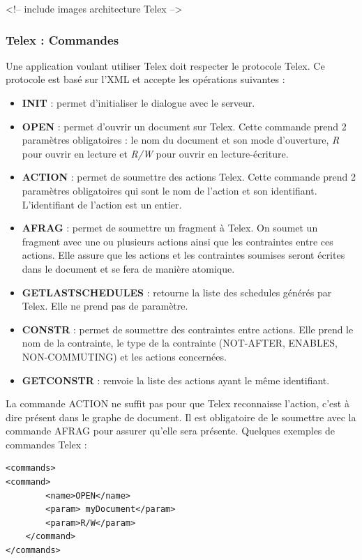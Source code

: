 \documentclass[a4paper,14pt]{article}
\begin{document}
<!-- include images architecture Telex -->


\subsubsection{Telex : Commandes}
Une application voulant utiliser Telex doit respecter le protocole Telex. Ce protocole est basé sur l'XML et accepte les opérations suivantes :
\begin{itemize}
\item \textbf{INIT} : permet d'initialiser le dialogue avec le serveur.
\item \textbf{OPEN} : permet d'ouvrir un document sur Telex. Cette commande prend 2 paramètres obligatoires : le nom du document et son mode d'ouverture, \textit{R} pour ouvrir en lecture et \textit{R/W} pour ouvrir en lecture-écriture.
\item \textbf{ACTION} : permet de soumettre des actions  Telex. Cette commande prend 2 paramètres obligatoires qui sont le nom de l'action  et son identifiant. L'identifiant de l'action est un entier.
\item \textbf{AFRAG} : permet de soumettre un fragment à Telex. On soumet un fragment avec une ou plusieurs actions ainsi que les contraintes entre ces actions. Elle assure que les actions et les
contraintes soumises seront écrites dans le document et se fera de manière atomique.
\item \textbf{GETLASTSCHEDULES} : retourne la liste des schedules générés par Telex. Elle ne prend pas de paramètre. 
\item \textbf{CONSTR} : permet de soumettre des contraintes entre actions. Elle prend le nom de la contrainte, le type de la contrainte (NOT-AFTER, ENABLES, NON-COMMUTING) et les actions concernées.
\item \textbf{GETCONSTR} : renvoie la liste des actions ayant le même identifiant. 
\end{itemize}

La commande ACTION ne suffit pas pour que Telex reconnaisse l'action, c'est à dire présent dans le graphe de document. Il est obligatoire de le soumettre avec la commande AFRAG pour assurer qu'elle sera présente.  
Quelques exemples de commandes Telex :

\begin{lstlisting}[caption=Un exemple de commande pour ouvrir un document sur Telex]
<commands>
<command>
		<name>OPEN</name>
		<param> myDocument</param>
		<param>R/W</param>
	</command>
</commands>
\end{lstlisting}
\end{document}
